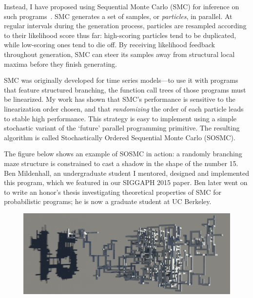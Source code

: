 \documentclass[
10pt, %
a4paper, %
oneside, %
headinclude,footinclude, %
BCOR5mm, %
]{scrartcl}
\begin{document}
Instead, I have proposed using Sequential Monte Carlo (SMC) for inference on such programs~\cite{SOSMC}. SMC generates a set of samples, or \emph{particles}, in parallel. At regular intervals during the generation process, particles are resampled according to their likelihood score thus far: high-scoring particles tend to be duplicated, while low-scoring ones tend to die off. By receiving likelihood feedback throughout generation, SMC can steer its samples away from structural local maxima before they finish generating.

SMC was originally developed for time series models---to use it with programs that feature structured branching, the function call trees of those programs must be linearized. My work has shown that SMC's performance is sensitive to the linearization order chosen, and that \emph{randomizing} the order of each particle leads to stable high performance. This strategy is easy to implement using a simple stochastic variant of the `future' parallel programming primitive. The resulting algorithm is called Stochastically Ordered Sequential Monte Carlo (SOSMC).

The figure below shows an example of SOSMC in action: a randomly branching maze structure is constrained to cast a shadow in the shape of the number 15. Ben Mildenhall, an undergraduate student I mentored, designed and implemented this program, which we featured in our SIGGAPH 2015 paper. Ben later went on to write an honor's thesis investigating theoretical properties of SMC for probabilistic programs; he is now a graduate student at UC Berkeley.


\vspace{1em}
\begin{figure}[h!]
	\centering
	\includegraphics[width=\linewidth]{figs/sosmc/pipes.png}
\end{figure}
\end{document}

